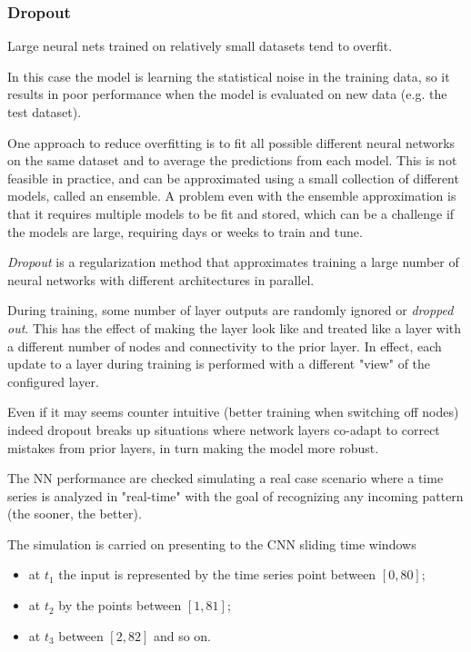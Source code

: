 \begin{attention}
\subsubsection{Dropout}

Large neural nets trained on relatively small datasets tend to overfit.

In this case the model is learning the statistical noise in the training data, so it results in poor performance when the model is evaluated on new data (e.g. the test dataset).

One approach to reduce overfitting is to fit all possible different neural networks on the same dataset and to average the predictions from each model. This is not feasible in practice, and can be approximated using a small collection of different models, called an ensemble. A problem even with the ensemble approximation is that it requires multiple models to be fit and stored, which can be a challenge if the models are large, requiring days or weeks to train and tune.

\emph{Dropout} is a regularization method that approximates training a large number of neural networks with different architectures in parallel.

During training, some number of layer outputs are randomly ignored or \emph{dropped out}. This has the effect of making the layer look like and treated like a layer with a different number of nodes and connectivity to the prior layer. In effect, each update to a layer during training is performed with a different "view" of the configured layer.

Even if it may seems counter intuitive (better training when switching off nodes) indeed dropout breaks up situations where network layers co-adapt to correct mistakes from prior layers, in turn making the model more robust.
\end{attention}

The NN performance are checked simulating a real case scenario where a time series is analyzed in "real-time" with the goal of recognizing any incoming pattern (the sooner, the better). 

The simulation is carried on presenting to the CNN sliding time windows
\begin{itemize}
	\item at $t_1$ the input is represented by the time series point between \([0, 80]\);
	\item at $t_2$ by the points between \([1, 81]\);
	\item at $t_3$ between \([2, 82]\) and so on.
\end{itemize}

